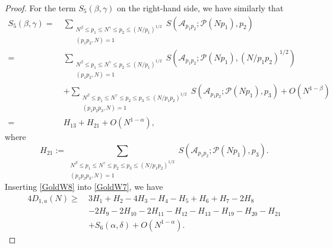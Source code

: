 \documentclass[12pt, a4paper]{amsart}
\def\leq{\leqslant}
\def\le{\leqslant}
\def\ge{\geqslant}
\theoremstyle{plain}
\theoremstyle{remark}
\numberwithin{equation}{section}
\begin{document}
\begin{proof}
For the term $S_5(\beta,\gamma)$ on the right-hand side, 
we have similarly that 
		\begin{equation}\label{GoldW8}
		\begin{split}
		S_5(\beta,\gamma)=\ &\sum_{\substack{N^\beta \le p_1 \le N^\gamma \le p_2 \le (N/p_1)^{1/2} \\ (p_1 p_2, N) = 1}}  S(\mathscr{A}_{p_1 p_2}; \mathscr{P}(N p_1), p_2)\\
		=\ & \sum_{\substack{N^{\beta} \leq p_1 \le N^{\gamma} \leq p_2 \le (N/p_1)^{1/2} \\ (p_1 p_2, N) = 1}} S(\mathscr{A}_{p_1 p_2}; \mathscr{P}(N p_1), (N/p_1 p_2)^{1/2})\\
		&+\sum_{\substack{N^{\beta} \leq p_1 \le N^{\gamma} \leq p_2 \le p_3\le (N/p_1p_2)^{1/2} \\ (p_1 p_2 p_3, N) = 1}} S(\mathscr{A}_{p_1 p_2}; \mathscr{P}(N p_1), p_3)+O(N^{1-\beta})\\
		=\ &H_{13}+H_{21}+O(N^{1-\alpha}),
		\end{split}
		\end{equation}
		where 
		\begin{equation}
		H_{21}:=\sum_{\substack{N^{\beta} \leq p_1 \le N^{\gamma} \leq p_2 \le p_3\le (N/p_1p_2)^{1/2} \\ (p_1 p_2 p_3, N) = 1}} S(\mathscr{A}_{p_1 p_2}; \mathscr{P}(N p_1), p_3). 
		\end{equation}
Inserting \eqref{GoldW8} into \eqref{GoldW7}, we have
\begin{equation}\label{GoldW9}
\begin{split}
4D_{1,a}(N)
\ge\ & 3H_1+H_2-4H_3-H_4-H_5+H_6+H_7-2H_8\\
&-2H_9-2H_{10}-2H_{11}-H_{12}-H_{13}-H_{19}-H_{20}-H_{21} \\ 
& +S_6(\alpha,\delta)+O(N^{1-\alpha}).
\end{split}
\end{equation}
		

\end{proof}
\end{document}
